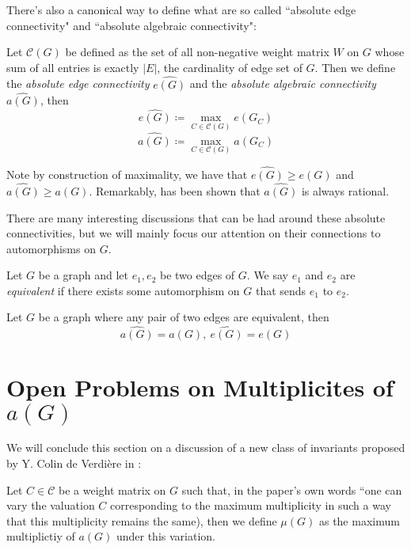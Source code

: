 \documentclass{article}
\begin{document}
There's also a canonical way to define what are so called ``absolute edge connectivity" and ``absolute algebraic connectivity":

\begin{definition}
    Let $\mathscr{C}(G)$ be defined as the set of all non-negative weight matrix $W$ on $G$ whose sum of all entries is exactly $|E|$, the cardinality of edge set of $G$. Then we define the \textit{absolute edge connectivity} $\hat{e(G)}$ and the \textit{absolute algebraic connectivity} $\hat{a(G)}$, then
    \[\hat{e(G)} \coloneqq \max_{C \in \mathscr{C}(G)} e(G_C)\]
    \[\hat{a(G)} \coloneqq \max_{C \in \mathscr{C}(G)} a(G_C)\]
\end{definition}

\begin{remark}
    Note by construction of maximality, we have that $\hat{e(G)} \geq e(G)$ and $\hat{a(G)} \geq a(G)$. Remarkably, has been shown that $\hat{a(G)}$ is always rational.
\end{remark}

There are many interesting discussions that can be had around these absolute connectivities, but we will mainly focus our attention on their connections to automorphisms on $G$.

\begin{definition}
    Let $G$ be a graph and let $e_1, e_2$ be two edges of $G$. We say $e_1$ and $e_2$ are \textit{equivalent} if there exists some automorphism on $G$ that sends $e_1$ to $e_2$.
\end{definition}

\begin{theorem}
    Let $G$ be a graph where any pair of two edges are equivalent, then
    \[\hat{a(G)} = a(G),\ \hat{e(G)} = e(G)\]
\end{theorem}

\section{Open Problems on Multiplicites of $a(G)$}

We will conclude this section on a discussion of a new class of invariants proposed by Y. Colin de Verdière in \cite{de_verdière_1990}:

\begin{definition}
Let $C \in \mathscr{C}$ be a weight matrix on $G$ such that, in the paper's own words ``one can vary the valuation $C$ corresponding to the maximum multiplicity in such a way that this multiplicity remains the same), then we define $\mu(G)$ as the maximum multiplictiy of $a(G)$ under this variation.
\end{definition}
\end{document}
